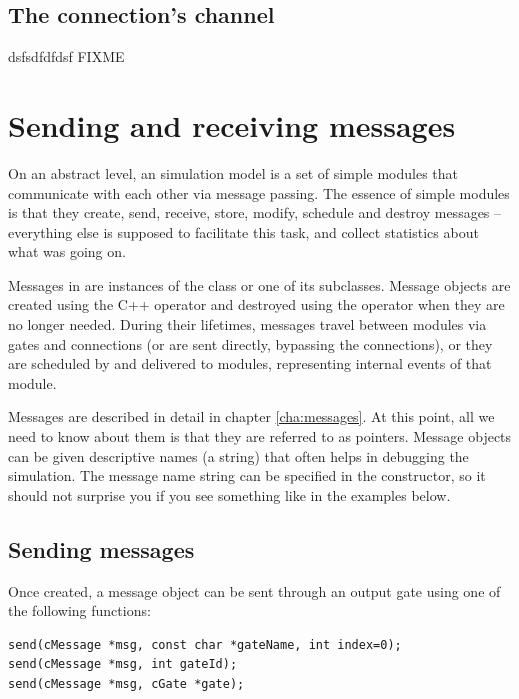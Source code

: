 \subsection{The connection's channel}

dsfsdfdfdsf
FIXME



\section{Sending and receiving messages}
\label{sec:simple-modules:sending-and-receiving}

On an abstract level, an {\opp} simulation model is a set of
simple modules that communicate with each other via message passing.
The essence of simple modules is that they create, send, receive,
store, modify, schedule and destroy messages -- everything else
is supposed to facilitate this task, and collect statistics
about what was going on.

Messages in {\opp} are instances of the  class or
one of its subclasses. Message objects are created using the C++
 operator and destroyed using the  operator
when they are no longer needed. During their lifetimes,
messages travel between modules via gates and connections
(or are sent directly, bypassing the connections), or
they are scheduled by and delivered to modules,
representing internal events of that module.

Messages are described in detail in chapter \ref{cha:messages}.
At this point, all we need to know about them is that they are
referred to as  pointers. Message objects
can be given descriptive names (a  string)
that often helps in debugging the simulation. The message
name string can be specified in the constructor, so it
should not surprise you if you see something like
 in the examples below.



\subsection{Sending messages}

Once created, a message object can be sent through an
output gate using one of the following functions:

\begin{verbatim}
send(cMessage *msg, const char *gateName, int index=0);
send(cMessage *msg, int gateId);
send(cMessage *msg, cGate *gate);
\end{verbatim}

